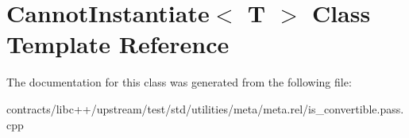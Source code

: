 \hypertarget{class_cannot_instantiate}{}\section{Cannot\+Instantiate$<$ T $>$ Class Template Reference}
\label{class_cannot_instantiate}


The documentation for this class was generated from the following file\+:\begin{DoxyCompactItemize}
\item 
contracts/libc++/upstream/test/std/utilities/meta/meta.\+rel/is\+\_\+convertible.\+pass.\+cpp\end{DoxyCompactItemize}
